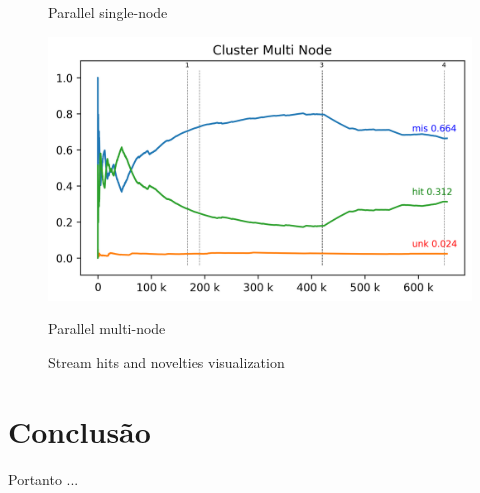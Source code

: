 \begin{figure}[htb]
\begin{minipage}{0.48\textwidth}
    \caption{Parallel single-node}
    \label{fig:cluster-sub-single}
  \end{minipage}
  \hfill
  \begin{minipage}{0.48\textwidth}
    \centering
    \includegraphics[width=1\linewidth]{experiments/tmi-n12-log.png}
    \caption{Parallel multi-node}
    \label{fig:cluster-sub-multi}
  \end{minipage}
  \caption{Stream hits and novelties visualization}
  \label{fig:visualization}
\end{figure}


\section{Conclusão}
\label{sec:exp-conclusao}

Portanto ... 
